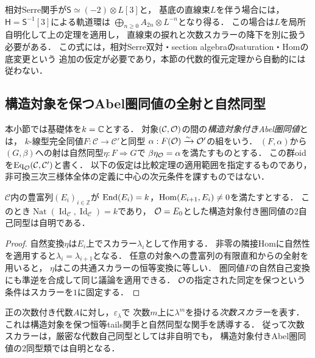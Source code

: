 \begin{remark}[相対Serre軌道環への適用範囲]
\label{rem:abel-relative-serre-line-twist}
相対Serre関手が$\mathsf S\simeq(-2)\otimes L[3]$と，
基底の直線束$L$を伴う場合には，$\mathsf H=\mathsf S^{-1}[3]$による軌道環は
$\bigoplus_{n\geq0}A_{2n}\otimes L^{-n}$となり得る．
この場合は$L$を局所自明化して上の定理を適用し，
直線束の捩れと次数スカラーの降下を別に扱う必要がある．
この式には，相対Serre双対・section algebraのsaturation・Homの底変更という
追加の仮定が必要であり，本節の代数的復元定理から自動的には従わない．
\end{remark}

\subsection{構造対象を保つAbel圏同値の全射と自然同型}
\label{subsec:abel-pointed-field-hom}

本小節では基礎体を$k=\mathbb C$とする．
対象$(\mathcal C,\mathcal O)$の間の\emph{構造対象付きAbel圏同値}とは，
$k$-線型完全同値$F:\mathcal C\to\mathcal C'$と同型
$\alpha:F(\mathcal O)\xrightarrow{\sim}\mathcal O'$の組をいう．
$(F,\alpha)$から$(G,\beta)$への射は自然同型$\eta:F\Rightarrow G$で
$\beta\eta_{\mathcal O}=\alpha$を満たすものとする．
この群oidを$\operatorname{Eq}_{\mathcal O}(\mathcal C,\mathcal C')$と書く．
以下の仮定は比較定理の適用範囲を指定するものであり，
非可換三次三様体全体の定義に中心の次元条件を課すものではない．

\begin{lemma}[豊富な偶数列によるスカラー中心の認識]
\label{lem:abel-pointed-scalar-center}
$\mathcal C$内の豊富列$(E_i)_{i\in\mathbb Z}$が
$\operatorname{End}(E_i)=k$，$\operatorname{Hom}(E_{i+1},E_i)\ne0$を満たすとする．
このとき$\operatorname{Nat}(\operatorname{Id}_{\mathcal C},
\operatorname{Id}_{\mathcal C})=k$であり，
$\mathcal O=E_0$とした構造対象付き圏同値の2自己同型は自明である．
\end{lemma}
\begin{proof}
自然変換$\eta$は$E_i$上でスカラー$\lambda_i$として作用する．
非零の隣接Homに自然性を適用すると$\lambda_i=\lambda_{i+1}$となる．
任意の対象への豊富列の有限直和からの全射を用いると，
$\eta$はこの共通スカラーの恒等変換に等しい．
圏同値$F$の自然自己変換にも準逆を合成して同じ議論を適用できる．
$\mathcal O$の指定された同定を保つという条件はスカラーを$1$に固定する．
\end{proof}

正の次数付き代数$A$に対し，$\varepsilon_\lambda$で
次数$m$上に$\lambda^m$を掛ける\emph{次数スカラー}を表す．
これは構造対象を保つ恒等tails関手と自然同型な関手を誘導する．
従って次数スカラーは，厳密な代数自己同型としては非自明でも，
構造対象付きAbel圏同値の2同型類では自明となる．

